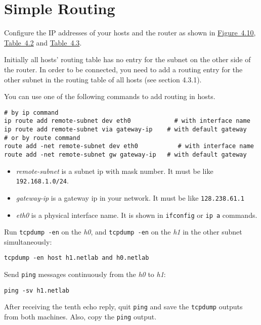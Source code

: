\documentclass{../UTNetLab}
\begin{document}
\section{Simple Routing}
    Configure the IP addresses of your hosts and the router as shown in \hyperref[fig:4.10]{Figure~4.10}, \hyperref[tab:4.2]{Table~4.2} and \hyperref[tab:4.3]{Table~4.3}.

    Initially all hosts’ routing table has no entry for the subnet on the other side of the router.
    In order to be connected, you need to add a routing entry for the other subnet in the routing table of all hosts (see section 4.3.1).

    You can use one of the following commands to add routing in hosts.
    \begin{lstlisting}[emph={eth0,gateway-ip,remote-subnet},morekeywords={[3]add,dev,via,gw}]
# by ip command
ip route add remote-subnet dev eth0            # with interface name
ip route add remote-subnet via gateway-ip    # with default gateway
# or by route command
route add -net remote-subnet dev eth0           # with interface name
route add -net remote-subnet gw gateway-ip   # with default gateway
    \end{lstlisting}
    \begin{itemize}
        \item \textit{remote-subnet} is a subnet ip with mask number.
                It must be like \lstinline{192.168.1.0/24}.
        \item \textit{gateway-ip} is a gateway ip in your network.
                It must be like \lstinline{128.238.61.1}
        \item \textit{eth0} is a physical interface name.
                It is shown in \lstinline{ifconfig} or \lstinline{ip a} commands.
    \end{itemize}
    

    Run \lstinline{tcpdump -en} on the \textit{h0}, and \lstinline{tcpdump -en} on the \textit{h1} in the other subnet simultaneously:
    \begin{lstlisting}[emph={h0,h1,netlab},morekeywords={[3]host,and}]
tcpdump -en host h1.netlab and h0.netlab
    \end{lstlisting}
    Send \lstinline{ping} messages continuously from the \textit{h0} to \textit{h1}:
    \begin{lstlisting}[emph={h1, netlab}]
ping -sv h1.netlab
    \end{lstlisting}
    After receiving the tenth echo reply, quit \lstinline{ping} and save the \lstinline{tcpdump} outputs from both machines.
    Also, copy the \lstinline{ping} output.
\end{document}
